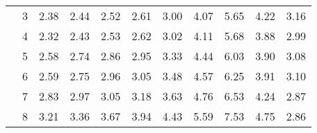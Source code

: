 \begin{tabular}{llrrrrrrrrr}
       & 3 & 2.38 & 2.44 & 2.52 & 2.61 & 3.00 & 4.07 & 5.65 & 4.22 & 3.16 \\
       & 4 & 2.32 & 2.43 & 2.53 & 2.62 & 3.02 & 4.11 & 5.68 & 3.88 & 2.99 \\
       & 5 & 2.58 & 2.74 & 2.86 & 2.95 & 3.33 & 4.44 & 6.03 & 3.90 & 3.08 \\
       & 6 & 2.59 & 2.75 & 2.96 & 3.05 & 3.48 & 4.57 & 6.25 & 3.91 & 3.10 \\
       & 7 & 2.83 & 2.97 & 3.05 & 3.18 & 3.63 & 4.76 & 6.53 & 4.24 & 2.87 \\
       & 8 & 3.21 & 3.36 & 3.67 & 3.94 & 4.43 & 5.59 & 7.53 & 4.75 & 2.86 \\
\bottomrule
\end{tabular}
